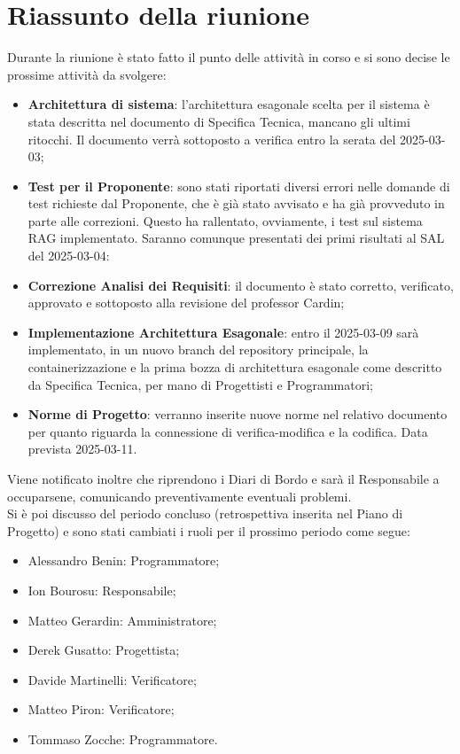 \section{Riassunto della riunione}
Durante la riunione è stato fatto il punto delle attività in corso e si sono decise le prossime attività da svolgere:
\begin{itemize}
    \item \textbf{Architettura di sistema}: l'architettura esagonale scelta per il sistema è stata descritta nel documento di Specifica Tecnica, mancano gli ultimi ritocchi. Il documento verrà sottoposto a verifica entro la serata del 2025-03-03;
    \item \textbf{Test per il Proponente}: sono stati riportati diversi errori nelle domande di test richieste dal Proponente, che è già stato avvisato e ha già provveduto in parte alle correzioni. Questo ha rallentato, ovviamente, i test sul sistema RAG implementato. Saranno comunque presentati dei primi risultati al SAL del 2025-03-04:
    \item \textbf{Correzione Analisi dei Requisiti}: il documento è stato corretto, verificato, approvato e sottoposto alla revisione del professor Cardin;
    \item \textbf{Implementazione Architettura Esagonale}: entro il 2025-03-09 sarà implementato, in un nuovo branch del repository principale, la containerizzazione e la prima bozza di architettura esagonale come descritto da Specifica Tecnica, per mano di Progettisti e Programmatori;
    \item \textbf{Norme di Progetto}: verranno inserite nuove norme nel relativo documento per quanto riguarda la connessione di verifica-modifica e la codifica. Data prevista 2025-03-11. 

\end{itemize}
Viene notificato inoltre che riprendono i Diari di Bordo e sarà il Responsabile a occuparsene, comunicando preventivamente eventuali problemi.
\\
Si è poi discusso del periodo concluso (retrospettiva inserita nel Piano di Progetto) e sono stati cambiati i ruoli per il prossimo periodo come segue:
\begin{itemize}
    \item Alessandro Benin: Programmatore;
    \item Ion Bourosu: Responsabile;
    \item Matteo Gerardin: Amministratore;
    \item Derek Gusatto: Progettista;
   \item Davide Martinelli: Verificatore;
    \item Matteo Piron: Verificatore;
    \item Tommaso Zocche: Programmatore.
  \end{itemize}
